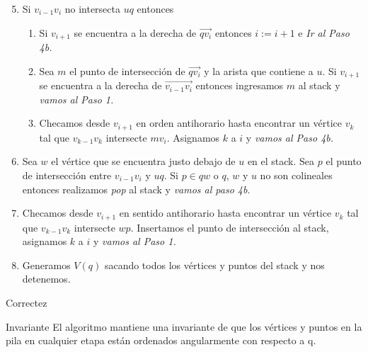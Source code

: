 \documentclass[aspectratio=169,xcolor=dvipsnames, t]{beamer}
\begin{document}
\begin{frame}{}
    \begin{enumerate}
     \setcounter{enumi}{4} 
            \item Si $v_{i-1}v_{i}$ no intersecta $uq$ entonces
                \begin{enumerate}
                    \item Si $v_{i+1}$ se encuentra a la derecha de $\overrightarrow{qv_{i}}$ entonces $i := i + 1$ e \textit{Ir al Paso 4b.}
                    \item Sea $m$ el punto de intersección de $\overrightarrow{qv_{i}}$ y la arista que contiene a $u$. Si $v_{i+1}$ se encuentra a la derecha de $\overrightarrow{v_{i-1}v_{i}}$ entonces ingresamos $m$ al stack y \textit{vamos al Paso 1.}
                    \item Checamos desde $v_{i+1}$ en orden antihorario hasta encontrar un vértice $v_{k}$ tal que $v_{k-1}v_{k}$ intersecte $mv_{i}$. Asignamos $k$ a $i$ y \textit{vamos al Paso 4b.}
                \end{enumerate}
            \item Sea $w$ el vértice que se encuentra justo debajo de $u$ en el stack. Sea $p$ el punto de intersección entre $v_{i-1}v_{i}$ y $uq$. Si $p \in qw$ o $q$, $w$ y $u$ no son colineales entonces realizamos \textit{pop} al stack y \textit{vamos al paso 4b}.
            \item Checamos desde $v_{i+1}$ en sentido antihorario hasta encontrar un vértice $v_{k}$ tal que $v_{k-1}v_{k}$ intersecte $wp$. Insertamos el punto de intersección al stack, asignamos $k$ a $i$ y \textit{vamos al Paso 1.}
            \item Generamos $V(q)$ sacando todos los vértices y puntos del stack y nos detenemos.
    \end{enumerate}
\end{frame}

\begin{frame}{Correctez}
    \begin{block}{Invariante}
         El algoritmo mantiene una invariante de que los vértices y puntos en la pila en cualquier etapa están ordenados angularmente con respecto a q.
    \end{block}    
\end{frame}


\begin{frame}{}
    
\end{frame}
\end{document}
